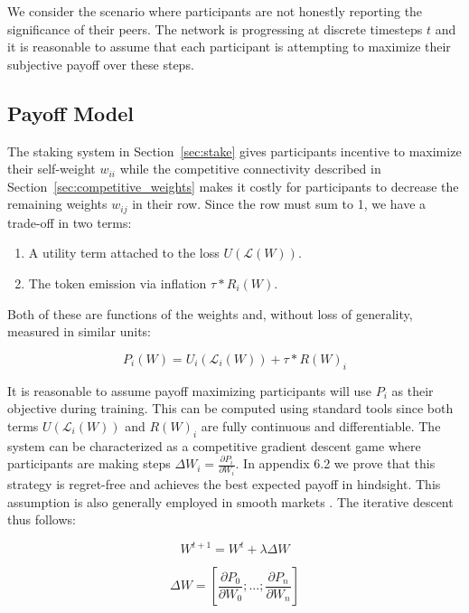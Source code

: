 \documentclass{article}
\begin{document}
We consider the scenario where participants are not honestly reporting the significance of their peers. The network is progressing at discrete timesteps $t$ and it is reasonable to assume that each participant is attempting to maximize their subjective payoff over these steps.

\subsection{Payoff Model}

The staking system in Section~\ref{sec:stake} gives participants incentive to maximize their self-weight $w_{ii}$ while the competitive connectivity described in Section~\ref{sec:competitive_weights} makes it costly for participants to decrease the remaining weights $w_{ij}$ in their row. Since the row must sum to 1, we have a trade-off in two terms:

\begin{enumerate}
	\item A utility term attached to the loss $U(\mathcal{L}(W))$.
	\item The token emission via inflation $\tau * R_i(W)$. 
\end{enumerate}

Both of these are functions of the weights and, without loss of generality, measured in similar units:

\begin{equation}
P_i (W) = U_i(\mathcal{L}_i(W)) + \tau * R(W)_i
\end{equation}

It is reasonable to assume payoff maximizing participants will use $P_i$ as their objective during training. This can be computed using standard tools since both terms $U(\mathcal{L}_i(W))$ and $R(W)_i$ are fully continuous and differentiable. The system can be characterized as a competitive gradient descent game where participants are making steps $\Delta W_i = \frac{\partial P_i}{\partial W_i}$. In appendix 6.2 we prove that this strategy is regret-free and achieves the best expected payoff in hindsight. This assumption is also generally employed in smooth markets \cite{balduzzi2020smooth}. The iterative descent thus follows:


\begin{equation}
W^{t+1} = W^{t} + \lambda \Delta W 
\end{equation}

\begin{equation}
\label{eq:grad_step2}
\Delta W = [\frac{\partial P_0}{\partial W_0} ; ... ;\frac{\partial P_n}{\partial W_n}]
\end{equation}
\end{document}
